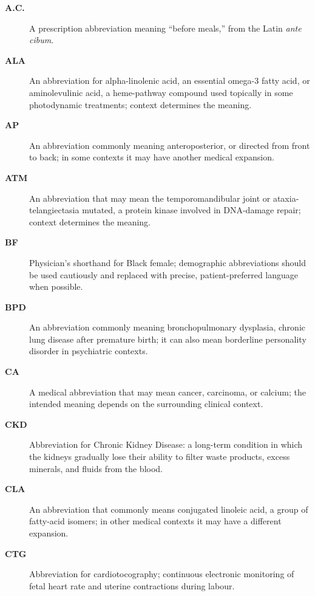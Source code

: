 \small
\begin{description}
\item[\textbf{A.C.}] A prescription abbreviation meaning “before meals,” from the Latin \textit{ante cibum}.

\item[\textbf{ALA}] An abbreviation for alpha-linolenic acid, an essential omega-3 fatty acid, or aminolevulinic acid, a heme-pathway compound used topically in some photodynamic treatments; context determines the meaning.

\item[\textbf{AP}] An abbreviation commonly meaning anteroposterior, or directed from front to back; in some contexts it may have another medical expansion.

\item[\textbf{ATM}] An abbreviation that may mean the temporomandibular joint or ataxia-telangiectasia mutated, a protein kinase involved in DNA-damage repair; context determines the meaning.

\item[\textbf{BF}] Physician's shorthand for Black female; demographic abbreviations should be used cautiously and replaced with precise, patient-preferred language when possible.

\item[\textbf{BPD}] An abbreviation commonly meaning bronchopulmonary dysplasia, chronic lung disease after premature birth; it can also mean borderline personality disorder in psychiatric contexts.

\item[\textbf{CA}] A medical abbreviation that may mean cancer, carcinoma, or calcium; the intended meaning depends on the surrounding clinical context.

\item[\textbf{CKD}] Abbreviation for Chronic Kidney Disease: a long-term condition in which the kidneys gradually lose their ability to filter waste products, excess minerals, and fluids from the blood.

\item[\textbf{CLA}] An abbreviation that commonly means conjugated linoleic acid, a group of fatty-acid isomers; in other medical contexts it may have a different expansion.

\item[\textbf{CTG}] Abbreviation for cardiotocography; continuous electronic monitoring of fetal heart rate and uterine contractions during labour.


\end{description}
